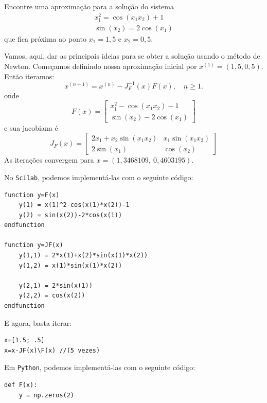 \begin{ex} Encontre uma aproximação para a solução do sistema
\begin{eqnarray*}
x_1^2=\cos(x_1x_2)+1\\
\sin(x_2)=2\cos(x_1)
\end{eqnarray*}
que fica próxima ao ponto $x_1=1,5$ e $x_2=0,5$.
\end{ex}
\begin{sol} Vamos, aqui, dar as principais ideias para se obter a solução usando o método de Newton. 
Começamos definindo nossa aproximação inicial por $x^{(1)} = (1,5, 0,5)$. Então iteramos:
\begin{equation*}
  x^{(n+1)} = x^{(n)} - J_F^{-1}(x)F(x), \quad n\geq 1.
\end{equation*}
onde
  \begin{equation*}
    F(x)=\left[\begin{array}{c}
        \displaystyle x_1^2-\cos(x_1x_2)-1\\
        \displaystyle \sin(x_2)-2\cos(x_1)
      \end{array}\right]  
  \end{equation*}
e sua jacobiana é 
\begin{equation*}
  J_F(x) = \left[\begin{array}{cc}
    \displaystyle 2x_1 +x_2\sin(x_1x_2) & x_1\sin(x_1x_2)\\
    \displaystyle 2\sin(x_1) & \cos(x_2)
  \end{array}\right]
\end{equation*}
As iterações convergem para $x = (1,3468109,~0,4603195)$.

\ifisscilab
No \verb+Scilab+, podemos implementá-las com o seguinte código:
\begin{verbatim}
function y=F(x)
    y(1) = x(1)^2-cos(x(1)*x(2))-1
    y(2) = sin(x(2))-2*cos(x(1))
endfunction

function y=JF(x)
    y(1,1) = 2*x(1)+x(2)*sin(x(1)*x(2)) 
    y(1,2) = x(1)*sin(x(1)*x(2))

    y(2,1) = 2*sin(x(1)) 
    y(2,2) = cos(x(2))
endfunction
\end{verbatim}

E agora, basta iterar:
\begin{verbatim}
x=[1.5; .5]
x=x-JF(x)\F(x) //(5 vezes)
\end{verbatim}  
\fi
\ifispython
Em \verb+Python+, podemos implementá-las com o seguinte código:
\begin{verbatim}
def F(x):
    y = np.zeros(2)
    

\end{verbatim}
\end{sol}

